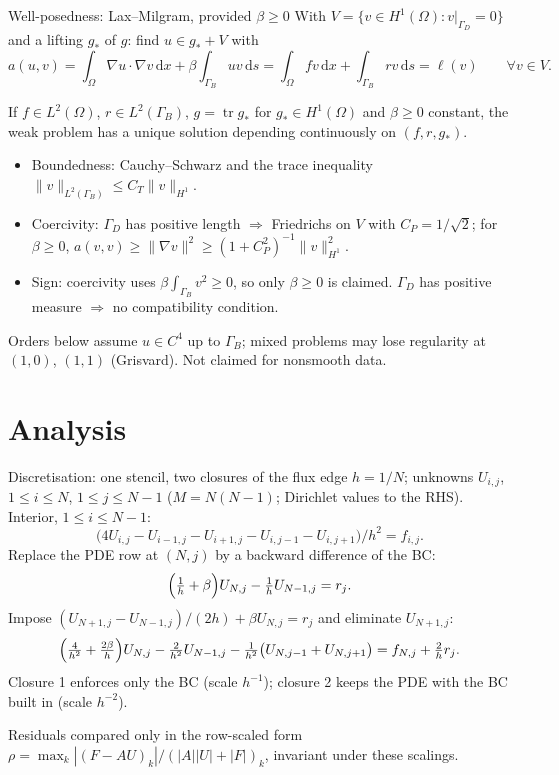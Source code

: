 \documentclass[aspectratio=169,8pt,t]{beamer}
\newcommand{\GD}{\Gamma_D}\newcommand{\GB}{\Gamma_B}\newcommand{\dd}{\,\mathrm{d}}
\begin{document}
\begin{frame}{Well-posedness: Lax--Milgram, provided $\beta\ge 0$}
\bodytop
With $V=\{v\in H^1(\Omega):v|_{\GD}=0\}$ and a lifting $g_\ast$ of $g$: find $u\in g_\ast+V$ with
\[
a(u,v)=\int_\Omega\nabla u\cdot\nabla v\dd x+\beta\int_{\GB}uv\dd s=\int_\Omega fv\dd x+\int_{\GB}rv\dd s=\ell(v)\qquad\forall v\in V.
\]
\begin{proposition*}
If $f\in L^2(\Omega)$, $r\in L^2(\GB)$, $g=\operatorname{tr}g_\ast$ for $g_\ast\in H^1(\Omega)$ and $\beta\ge0$ constant, the weak problem has a unique solution depending continuously on $(f,r,g_\ast)$.
\end{proposition*}
\begin{itemize}\setlength{\itemsep}{\blockskip}
\item Boundedness: Cauchy--Schwarz and the trace inequality $\|v\|_{L^2(\GB)}\le C_T\|v\|_{H^1}$.
\item Coercivity: $\GD$ has positive length $\Rightarrow$ Friedrichs on $V$ with $C_P=1/\sqrt2$; for $\beta\ge0$, $a(v,v)\ge\|\nabla v\|^2\ge(1+C_P^2)^{-1}\|v\|^2_{H^1}$.
\item Sign: coercivity uses $\beta\int_{\GB}v^2\ge0$, so only $\beta\ge0$ is claimed. $\GD$ has positive measure $\Rightarrow$ no compatibility condition.
\end{itemize}
\closing{Orders below assume $u\in C^4$ up to $\GB$; mixed problems may lose regularity at $(1,0)$, $(1,1)$ (Grisvard). Not claimed for nonsmooth data.}
\end{frame}

\section{Analysis}
\begin{frame}{Discretisation: one stencil, two closures of the flux edge}
\bodytop
$h=1/N$; unknowns $U_{i,j}$, $1\le i\le N$, $1\le j\le N-1$ ($M=N(N-1)$; Dirichlet values to the RHS). Interior, $1\le i\le N-1$:
\[
\bigl(4U_{i,j}-U_{i-1,j}-U_{i+1,j}-U_{i,j-1}-U_{i,j+1}\bigr)/h^2=f_{i,j}.
\]
 Replace the PDE row at $(N,j)$ by a backward difference of the BC:
\[
\Bigl(\tfrac1h+\beta\Bigr)U_{N,j}-\tfrac1h U_{N-1,j}=r_j .
\]
 Impose $(U_{N+1,j}-U_{N-1,j})/(2h)+\beta U_{N,j}=r_j$ and eliminate $U_{N+1,j}$:
\[
\Bigl(\tfrac4{h^2}+\tfrac{2\beta}h\Bigr)U_{N,j}-\tfrac2{h^2}U_{N-1,j}-\tfrac1{h^2}\bigl(U_{N,j-1}+U_{N,j+1}\bigr)=f_{N,j}+\tfrac2h r_j .
\]
Closure 1 enforces only the BC (scale $h^{-1}$); closure 2 keeps the PDE with the BC built in (scale $h^{-2}$).
\closing{Residuals compared only in the row-scaled form $\rho=\max_k|(F-AU)_k|/(|A||U|+|F|)_k$, invariant under these scalings.}
\end{frame}
\end{document}
